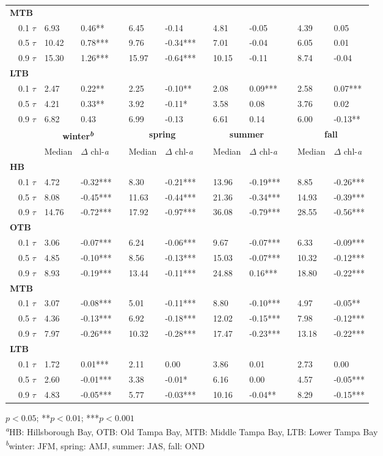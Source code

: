 \documentclass{svjour3}\usepackage[]{graphicx}\usepackage[]{color}
\begin{document}
\begin{table}[!tbp]
\begin{center}
\begin{tabular}{lllcllcllcll}
\hline
{\bfseries MTB}&&&&&&&&&&&\tabularnewline
~~0.1 $\tau$& 6.93& 0.46**&& 6.45&-0.14 && 4.81&-0.05 && 4.39& 0.05 \tabularnewline
~~0.5 $\tau$&10.42& 0.78***&& 9.76&-0.34***&& 7.01&-0.04 && 6.05& 0.01 \tabularnewline
~~0.9 $\tau$&15.30& 1.26***&&15.97&-0.64***&&10.15&-0.11 && 8.74&-0.04 \tabularnewline
\hline
{\bfseries LTB}&&&&&&&&&&&\tabularnewline
~~0.1 $\tau$& 2.47& 0.22**&& 2.25&-0.10**&& 2.08& 0.09***&& 2.58& 0.07***\tabularnewline
~~0.5 $\tau$& 4.21& 0.33**&& 3.92&-0.11*&& 3.58& 0.08 && 3.76& 0.02 \tabularnewline
~~0.9 $\tau$& 6.82& 0.43 && 6.99&-0.13 && 6.61& 0.14 && 6.00&-0.13**\tabularnewline
\hline
\multicolumn{1}{l}{\bfseries }&\multicolumn{2}{c}{\bfseries {\bf winter\textsuperscript{\textit{b}}}}&\multicolumn{1}{c}{\bfseries }&\multicolumn{2}{c}{\bfseries {\bf spring}}&\multicolumn{1}{c}{\bfseries }&\multicolumn{2}{c}{\bfseries {\bf summer}}&\multicolumn{1}{c}{\bfseries }&\multicolumn{2}{c}{\bfseries {\bf fall}}\tabularnewline
\cline{2-3} \cline{5-6} \cline{8-9} \cline{11-12}
~~&Median&$\Delta$ chl-\textit{a}&&Median&$\Delta$ chl-\textit{a}&&Median&$\Delta$ chl-\textit{a}&&Median&$\Delta$ chl-\textit{a}\tabularnewline
\hline
{\bfseries HB}&&&&&&&&&&&\tabularnewline
~~0.1 $\tau$& 4.72&-0.32***&& 8.30&-0.21***&&13.96&-0.19***&& 8.85&-0.26***\tabularnewline
~~0.5 $\tau$& 8.08&-0.45***&&11.63&-0.44***&&21.36&-0.34***&&14.93&-0.39***\tabularnewline
~~0.9 $\tau$&14.76&-0.72***&&17.92&-0.97***&&36.08&-0.79***&&28.55&-0.56***\tabularnewline
\hline
{\bfseries OTB}&&&&&&&&&&&\tabularnewline
~~0.1 $\tau$& 3.06&-0.07***&& 6.24&-0.06***&& 9.67&-0.07***&& 6.33&-0.09***\tabularnewline
~~0.5 $\tau$& 4.85&-0.10***&& 8.56&-0.13***&&15.03&-0.07***&&10.32&-0.12***\tabularnewline
~~0.9 $\tau$& 8.93&-0.19***&&13.44&-0.11***&&24.88& 0.16***&&18.80&-0.22***\tabularnewline
\hline
{\bfseries MTB}&&&&&&&&&&&\tabularnewline
~~0.1 $\tau$& 3.07&-0.08***&& 5.01&-0.11***&& 8.80&-0.10***&& 4.97&-0.05**\tabularnewline
~~0.5 $\tau$& 4.36&-0.13***&& 6.92&-0.18***&&12.02&-0.15***&& 7.98&-0.12***\tabularnewline
~~0.9 $\tau$& 7.97&-0.26***&&10.32&-0.28***&&17.47&-0.23***&&13.18&-0.22***\tabularnewline
\hline
{\bfseries LTB}&&&&&&&&&&&\tabularnewline
~~0.1 $\tau$& 1.72& 0.01***&& 2.11& 0.00 && 3.86& 0.01 && 2.73& 0.00 \tabularnewline
~~0.5 $\tau$& 2.60&-0.01***&& 3.38&-0.01*&& 6.16& 0.00 && 4.57&-0.05***\tabularnewline
~~0.9 $\tau$& 4.83&-0.05***&& 5.77&-0.03***&&10.16&-0.04**&& 8.29&-0.15***\tabularnewline
\hline
\end{tabular}\end{center}

\footnotesize *$p<0.05$; **$p<0.01$; ***$p<0.001$\\\textsuperscript{\textit{a}}HB: Hillsborough Bay, OTB: Old Tampa Bay, MTB: Middle Tampa Bay, LTB: Lower Tampa Bay\\\textsuperscript{\textit{b}}winter: JFM, spring: AMJ, summer: JAS, fall: OND\end{table}
\end{document}
